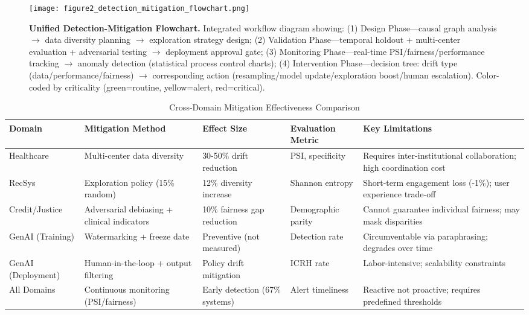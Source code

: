 \documentclass[11pt,a4paper]{article}
\begin{document}
\begin{figure}[htbp]
    \centering
    \texttt{[image: figure2\_detection\_mitigation\_flowchart.png]}
    \caption{\textbf{Unified Detection-Mitigation Flowchart.} Integrated workflow diagram showing: (1) Design Phase—causal graph analysis $\rightarrow$ data diversity planning $\rightarrow$ exploration strategy design; (2) Validation Phase—temporal holdout + multi-center evaluation + adversarial testing $\rightarrow$ deployment approval gate; (3) Monitoring Phase—real-time PSI/fairness/performance tracking $\rightarrow$ anomaly detection (statistical process control charts); (4) Intervention Phase—decision tree: drift type (data/performance/fairness) $\rightarrow$ corresponding action (resampling/model update/exploration boost/human escalation). Color-coded by criticality (green=routine, yellow=alert, red=critical).}
    \label{fig:detection_mitigation}
\end{figure}

\begin{table}[htbp]
\centering
\caption{Cross-Domain Mitigation Effectiveness Comparison}
\label{tab:mitigation_comparison}
\small
\begin{tabular}{@{}p{2.2cm}p{3cm}p{2.8cm}p{2.5cm}p{3cm}@{}}
\toprule
\textbf{Domain} & \textbf{Mitigation Method} & \textbf{Effect Size} & \textbf{Evaluation Metric} & \textbf{Key Limitations} \\
\midrule
Healthcare & Multi-center data diversity & 30-50\% drift reduction \cite{varoquaux2022,nestor2024} & PSI, specificity & Requires inter-institutional collaboration; high coordination cost \\
RecSys & Exploration policy (15\% random) & 12\% diversity increase \cite{chen2023} & Shannon entropy & Short-term engagement loss (-1\%); user experience trade-off \\
Credit/Justice & Adversarial debiasing + clinical indicators & 10\% fairness gap reduction \cite{vokinger2021} & Demographic parity & Cannot guarantee individual fairness; may mask disparities \\
GenAI (Training) & Watermarking + freeze date & Preventive (not measured) & Detection rate & Circumventable via paraphrasing; degrades over time \\
GenAI (Deployment) & Human-in-the-loop + output filtering & Policy drift mitigation \cite{pan2024} & ICRH rate & Labor-intensive; scalability constraints \\
All Domains & Continuous monitoring (PSI/fairness) & Early detection (67\% systems) \cite{nestor2024} & Alert timeliness & Reactive not proactive; requires predefined thresholds \\
\bottomrule
\end{tabular}
\end{table}
\end{document}
